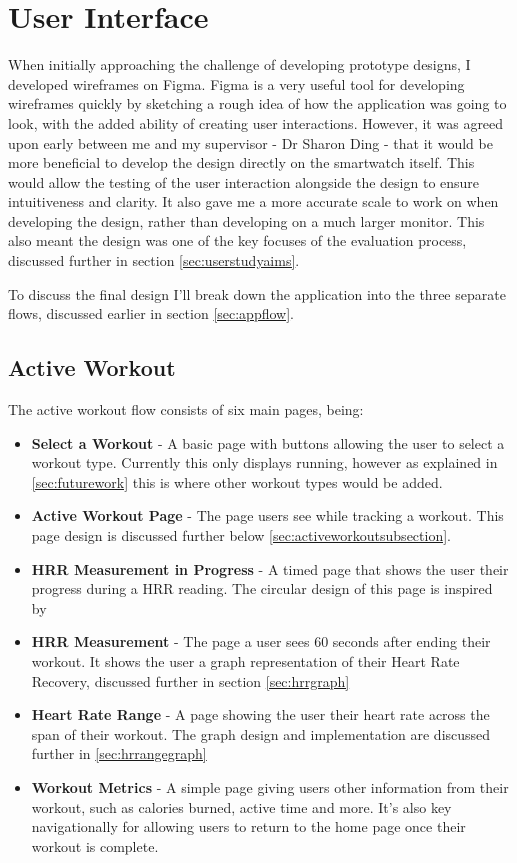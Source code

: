 \documentclass{l4proj}
\begin{document}
\section{User Interface}
\label{sec:ui}

When initially approaching the challenge of developing prototype designs, I developed wireframes on Figma. Figma is a very useful tool for developing wireframes quickly by sketching a rough idea of how the application was going to look, with the added ability of creating user interactions. However, it was agreed upon early between me and my supervisor - Dr Sharon Ding - that it would be more beneficial to develop the design directly on the smartwatch itself. This would allow the testing of the user interaction alongside the design to ensure intuitiveness and clarity. It also gave me a more accurate scale to work on when developing the design, rather than developing on a much larger monitor. This also meant the design was one of the key focuses of the evaluation process, discussed further in section \ref{sec:userstudyaims}.

To discuss the final design I’ll break down the application into the three separate flows, discussed earlier in section \ref{sec:appflow}. 

\subsection{Active Workout}
\label{sec:activeworkout}

The active workout flow consists of six main pages, being:

\begin{itemize}
    \item \textbf{Select a Workout} - A basic page with buttons allowing the user to select a workout type. Currently this only displays running, however as explained in \ref{sec:futurework} this is where other workout types would be added.
    \item \textbf{Active Workout Page} - The page users see while tracking a workout. This page design is discussed further below \ref{sec:activeworkoutsubsection}.
    \item \textbf{HRR Measurement in Progress} - A timed page that shows the user their progress during a HRR reading. The circular design of this page is inspired by \cite{TicDesign}
    \item \textbf{HRR Measurement} - The page a user sees 60 seconds after ending their workout. It shows the user a graph representation of their Heart Rate Recovery, discussed further in section \ref{sec:hrrgraph}
    \item \textbf{Heart Rate Range} -  A page showing the user their heart rate across the span of their workout. The graph design and implementation are discussed further in \ref{sec:hrrangegraph}
    \item \textbf{Workout Metrics} - A simple page giving users other information from their workout, such as calories burned, active time and more. It’s also key navigationally for allowing users to return to the home page once their workout is complete.
\end{itemize}
\end{document}

